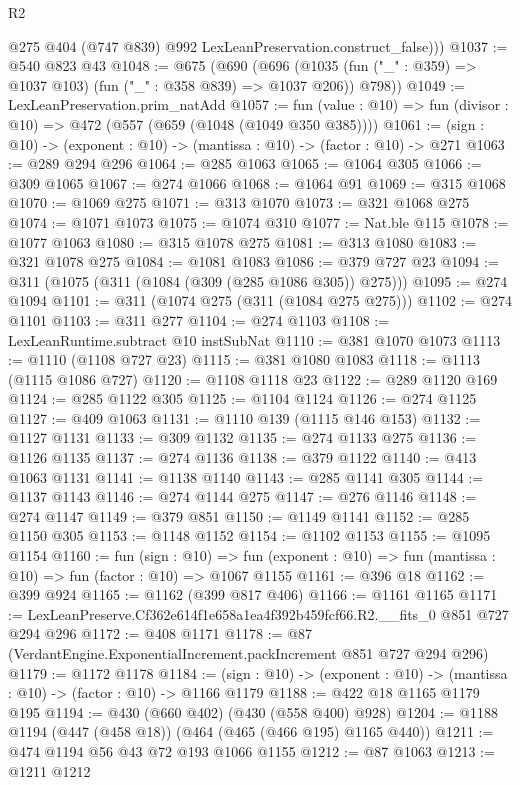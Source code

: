\begin{lexlean}{R2}
\begin{coremodule}
          @275
          @404
          (@747 @839)
          @992
          LexLeanPreservation.construct_false)))
@1037 := @540 @823 @43
@1048 := @675
    (@690
      (@696 (@1035 (fun ("_" : @359) => @1037 @103) (fun ("_" : @358 @839) => @1037 @206)) @798))
@1049 := LexLeanPreservation.prim_natAdd
@1057 := fun (value : @10) => fun (divisor : @10) => @472 (@557 (@659 (@1048 (@1049 @350 @385))))
@1061 := (sign : @10) -> (exponent : @10) -> (mantissa : @10) -> (factor : @10) -> @271
@1063 := @289 @294 @296
@1064 := @285 @1063
@1065 := @1064 @305
@1066 := @309 @1065
@1067 := @274 @1066
@1068 := @1064 @91
@1069 := @315 @1068
@1070 := @1069 @275
@1071 := @313 @1070
@1073 := @321 @1068 @275
@1074 := @1071 @1073
@1075 := @1074 @310
@1077 := Nat.ble @115
@1078 := @1077 @1063
@1080 := @315 @1078 @275
@1081 := @313 @1080
@1083 := @321 @1078 @275
@1084 := @1081 @1083
@1086 := @379 @727 @23
@1094 := @311 (@1075 (@311 (@1084 (@309 (@285 @1086 @305)) @275)))
@1095 := @274 @1094
@1101 := @311 (@1074 @275 (@311 (@1084 @275 @275)))
@1102 := @274 @1101
@1103 := @311 @277
@1104 := @274 @1103
@1108 := LexLeanRuntime.subtract @10 instSubNat
@1110 := @381 @1070 @1073
@1113 := @1110 (@1108 @727 @23)
@1115 := @381 @1080 @1083
@1118 := @1113 (@1115 @1086 @727)
@1120 := @1108 @1118 @23
@1122 := @289 @1120 @169
@1124 := @285 @1122 @305
@1125 := @1104 @1124
@1126 := @274 @1125
@1127 := @409 @1063
@1131 := @1110 @139 (@1115 @146 @153)
@1132 := @1127 @1131
@1133 := @309 @1132
@1135 := @274 @1133 @275
@1136 := @1126 @1135
@1137 := @274 @1136
@1138 := @379 @1122
@1140 := @413 @1063 @1131
@1141 := @1138 @1140
@1143 := @285 @1141 @305
@1144 := @1137 @1143
@1146 := @274 @1144 @275
@1147 := @276 @1146
@1148 := @274 @1147
@1149 := @379 @851
@1150 := @1149 @1141
@1152 := @285 @1150 @305
@1153 := @1148 @1152
@1154 := @1102 @1153
@1155 := @1095 @1154
@1160 := fun (sign : @10) =>
  fun (exponent : @10) => fun (mantissa : @10) => fun (factor : @10) => @1067 @1155
@1161 := @396 @18
@1162 := @399 @924
@1165 := @1162 (@399 @817 @406)
@1166 := @1161 @1165
@1171 := LexLeanPreserve.Cf362e614f1e658a1ea4f392b459fcf66.R2.__fits_0 @851 @727 @294 @296
@1172 := @408 @1171
@1178 := @87 (VerdantEngine.ExponentialIncrement.packIncrement @851 @727 @294 @296)
@1179 := @1172 @1178
@1184 := (sign : @10) -> (exponent : @10) -> (mantissa : @10) -> (factor : @10) -> @1166 @1179
@1188 := @422 @18 @1165 @1179 @195
@1194 := @430 (@660 @402) (@430 (@558 @400) @928)
@1204 := @1188 @1194 (@447 (@458 @18)) (@464 (@465 (@466 @195) @1165 @440))
@1211 := @474 @1194 @56 @43 @72 @193 @1066 @1155
@1212 := @87 @1063
@1213 := @1211 @1212

\end{coremodule}
\end{lexlean}
